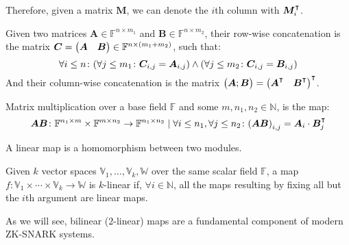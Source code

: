 Therefore, given a matrix \(\bm{M}\), we can denote the \(i\)th column with 
\(\bm{M}^{\transpose}_{i}\).

\begin{definition}
  Given two matrices \(\bm{A} \in \mathbb{F}^{n \times m_1}\) and 
  \(\bm{B} \in \mathbb{F}^{n \times m_2}\), their row-wise concatenation is the matrix 
  \(\bm{C} = 
  \begin{pmatrix*}
    \bm{A} & \bm{B}
  \end{pmatrix*}
    \in \mathbb{F}^{n \times \Parens*{m_1 + m_2}}\), such that:
  \[\forall i \le n\colon \Parens*{\forall j \le m_1 \colon \bm{C}_{i,j} = \bm{A}_{i,j}} \wedge 
  \Parens*{\forall j \le m_2\colon \bm{C}_{i,j} = \bm{B}_{i,j}}\]
  And their column-wise concatenation is the matrix \(
  \begin{pmatrix*}
    \bm{A}; \bm{B}
  \end{pmatrix*} =
  {\begin{pmatrix*}
    \bm{A}^{\transpose} & \bm{B}^{\transpose}
  \end{pmatrix*}}^{\transpose}
  \).
\end{definition}

\begin{definition}
  Matrix multiplication over a base field \(\mathbb{F}\) and some \(m, n_1, n_2 \in \mathbb{N}\), 
  is the map:
  \[
    \bm{A}\bm{B}\colon 
    \mathbb{F}^{n_1 \times m} \times \mathbb{F}^{m \times n_2} \to \mathbb{F}^{n_1 \times n_2} \mid 
    \forall i \le n_1, \forall j \le n_2\colon 
    \Parens*{\bm{A}\bm{B}}_{i,j} = \bm{A}_{i} \cdot \bm{B}^{\transpose}_{j}
  \] 
\end{definition}

\begin{definition}
   A linear map is a homomorphism between two modules.
\end{definition}
\begin{definition}
  Given \(k\) vector spaces \(\mathbb{V}_1, \dots, \mathbb{V}_k, \mathbb{W}\) over the same scalar 
  field \(\mathbb{F}\), a map 
  \(f\colon \mathbb{V}_1 \times \cdots \times \mathbb{V}_k \to \mathbb{W}\) 
  is \(k\)-linear if, \(\forall i \in \mathbb{N}\), all the maps resulting by fixing all but the 
  \(i\)th argument are linear maps.
\end{definition}

As we will see, bilinear (\(2\)-linear) maps are a fundamental component of modern ZK-SNARK systems.

